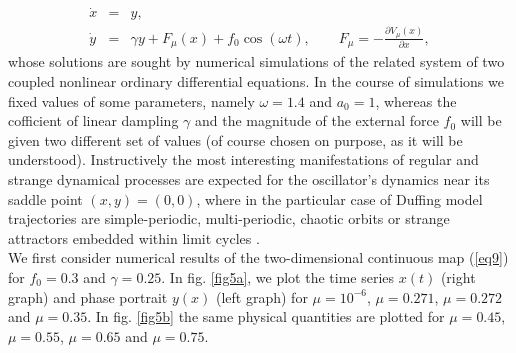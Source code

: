 \documentclass[%
 aip,
cha,
 amsmath,amssymb,
preprint,
]{revtex4-2}
\begin{document}
\begin{eqnarray}
\dot{x}&=& y, \nonumber \\
\dot{y}&=& \gamma y + F_{\mu}(x) + f_0\cos(\omega t), \qquad F_{\mu}=-\frac{\partial V_{\mu}(x)}{\partial x},  \label{eq9}
\end{eqnarray}
whose solutions are sought by numerical simulations of the related system of two coupled nonlinear ordinary differential equations. In the course of simulations we fixed values of some parameters, namely $\omega=1.4$ and $a_0=1$, whereas  the cofficient of linear dampling $\gamma$ and the magnitude of the external force $f_0$ will be given two different set of values (of course chosen on purpose, as it will be understood). Instructively the most interesting manifestations of regular and strange dynamical processes are expected for the oscillator's dynamics near its saddle point $(x, y)=(0, 0)$, where in the particular case of Duffing model trajectories are simple-periodic, multi-periodic, chaotic orbits or strange attractors embedded within limit cycles \cite{solduf2,toguy}.\\
We first consider numerical results of the two-dimensional continuous map (\ref{eq9}) for $f_0=0.3$ and $\gamma=0.25$. In fig. \ref{fig5a}, we plot the time series $x(t)$ (right graph) and phase portrait $y(x)$ (left graph) for $\mu=10^{-6}$, $\mu=0.271$, $\mu=0.272$ and $\mu=0.35$. In fig. \ref{fig5b} the same physical quantities are plotted for $\mu=0.45$, $\mu=0.55$, $\mu=0.65$ and $\mu=0.75$.
\end{document}
